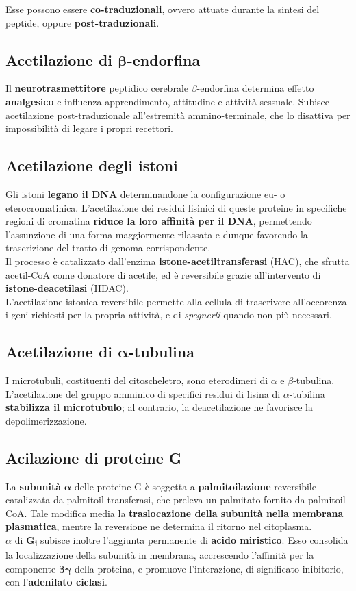 \documentclass[a4paper, 12pt]{article}
\begin{document}
Esse possono essere \textbf{co-traduzionali}, ovvero attuate durante la sintesi del peptide, oppure \textbf{post-traduzionali}.

\subsection{Acetilazione di $\boldsymbol\beta$-endorfina}
Il \textbf{neurotrasmettitore} peptidico cerebrale $\beta$-endorfina determina effetto \textbf{analgesico} e influenza apprendimento, attitudine e attività sessuale. Subisce acetilazione post-traduzionale all'estremità ammino-terminale, che lo disattiva per impossibilità di legare i propri recettori.

\subsection{Acetilazione degli istoni}
Gli istoni \textbf{legano il DNA} determinandone la configurazione eu- o eterocromatinica. L'acetilazione dei residui lisinici di queste proteine in specifiche regioni di cromatina \textbf{riduce la loro affinità per il DNA}, permettendo l'assunzione di una forma maggiormente rilassata e dunque favorendo la trascrizione del tratto di genoma corrispondente.\\
Il processo è catalizzato dall'enzima \textbf{istone-acetiltransferasi} (HAC), che sfrutta acetil-CoA come donatore di acetile, ed è reversibile grazie all'intervento di \textbf{istone-deacetilasi} (HDAC).\\
L'acetilazione istonica reversibile permette alla cellula di trascrivere all'occorenza i geni richiesti per la propria attività, e di \textit{spegnerli} quando non più necessari.

\subsection{Acetilazione di $\boldsymbol\alpha$-tubulina}
I microtubuli, costituenti del citoscheletro, sono eterodimeri di $\alpha$ e $\beta$-tubulina.\\
L'acetilazione del gruppo amminico di specifici residui di lisina di $\alpha$-tubilina \textbf{stabilizza il microtubulo}; al contrario, la deacetilazione ne favorisce la depolimerizzazione.

\subsection{Acilazione di proteine G}
La \textbf{subunità} $\boldsymbol\alpha$ delle proteine G è soggetta a \textbf{palmitoilazione} reversibile catalizzata da palmitoil-transferasi, che preleva un palmitato fornito da palmitoil-CoA. Tale modifica media la \textbf{traslocazione della subunità nella membrana plasmatica}, mentre la reversione ne determina il ritorno nel citoplasma.\\
$\alpha$ di \textbf{G\textsubscript{i}} subisce inoltre l'aggiunta permanente di \textbf{acido miristico}. Esso consolida la localizzazione della subunità in membrana, accrescendo l'affinità per la componente $\boldsymbol{\beta\gamma}$ della proteina, e promuove l'interazione, di significato inibitorio, con l'\textbf{adenilato ciclasi}.
\end{document}
